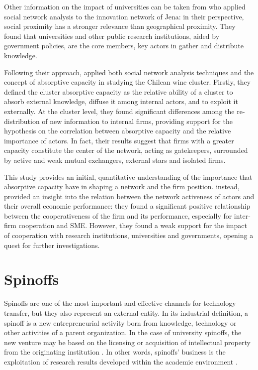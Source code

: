 Other information on the impact of universities can be taken from \citet{Cantner2006} who applied social network analysis to the innovation network of Jena: in their perspective, social proximity has a stronger relevance than geographical proximity. They found that universities and other public research institutions, aided by government policies, are the core members, key actors in gather and distribute knowledge.

Following their approach, \citet{Giuliani2005} applied both social network analysis techniques and the concept of absorptive capacity in studying the Chilean wine cluster. Firstly, they defined the cluster absorptive capacity as the relative ability of a cluster to absorb external knowledge, diffuse it among internal actors, and to exploit it externally. At the cluster level, they found significant differences among the re-distribution of new information to internal firms, providing support for the hypothesis on the correlation between absorptive capacity and the relative importance of actors. In fact, their results suggest that firms with a greater capacity constitute the center of the network, acting as gatekeepers, surrounded by active and weak mutual exchangers, external stars and isolated firms.

This study provides an initial, quantitative understanding of the importance that absorptive capacity have in shaping a network and the firm position. \citet{Zeng2010} instead, provided an insight into the relation between the network activeness of actors and their overall economic performance: they found a significant positive relationship between the cooperativeness of the firm and its performance, especially for inter-firm cooperation and SME. However, they found a weak support for the impact of cooperation with research institutions, universities and governments, opening a quest for further investigations.


\section{Spinoffs}

Spinoffs are one of the most important and effective channels for technology transfer, but they also represent an external entity. In its industrial definition, a spinoff is a new entrepreneurial activity born from knowledge, technology or other activities of a parent organization. In the case of university spinoffs, the new venture may be based on the licensing or acquisition of intellectual property from the originating institution \citep{Lockett2005a}. In other words, spinoffs' business is the exploitation of research results developed within the academic environment \citep{Rizzo2015}.

